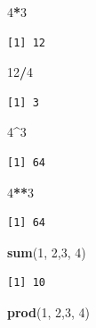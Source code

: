 \documentclass[]{book}
\newenvironment{Shaded}{\begin{snugshade}}{\end{snugshade}}
\newcommand{\KeywordTok}[1]{\textcolor[rgb]{0.13,0.29,0.53}{\textbf{#1}}}
\newcommand{\DecValTok}[1]{\textcolor[rgb]{0.00,0.00,0.81}{#1}}
\newcommand{\OperatorTok}[1]{\textcolor[rgb]{0.81,0.36,0.00}{\textbf{#1}}}
\newcommand{\NormalTok}[1]{#1}
\theoremstyle{definition}
\theoremstyle{definition}
\theoremstyle{definition}
\theoremstyle{remark}
\begin{document}
\begin{Shaded}
\begin{Highlighting}[]
\DecValTok{4}\OperatorTok{*}\DecValTok{3}
\end{Highlighting}
\end{Shaded}

\begin{verbatim}
[1] 12
\end{verbatim}

\begin{Shaded}
\begin{Highlighting}[]
\DecValTok{12}\OperatorTok{/}\DecValTok{4}
\end{Highlighting}
\end{Shaded}

\begin{verbatim}
[1] 3
\end{verbatim}

\begin{Shaded}
\begin{Highlighting}[]
\DecValTok{4}\OperatorTok{^}\DecValTok{3}
\end{Highlighting}
\end{Shaded}

\begin{verbatim}
[1] 64
\end{verbatim}

\begin{Shaded}
\begin{Highlighting}[]
\DecValTok{4}\OperatorTok{**}\DecValTok{3}
\end{Highlighting}
\end{Shaded}

\begin{verbatim}
[1] 64
\end{verbatim}

\begin{Shaded}
\begin{Highlighting}[]
\KeywordTok{sum}\NormalTok{(}\DecValTok{1}\NormalTok{, }\DecValTok{2}\NormalTok{,}\DecValTok{3}\NormalTok{, }\DecValTok{4}\NormalTok{)}
\end{Highlighting}
\end{Shaded}

\begin{verbatim}
[1] 10
\end{verbatim}

\begin{Shaded}
\begin{Highlighting}[]
\KeywordTok{prod}\NormalTok{(}\DecValTok{1}\NormalTok{, }\DecValTok{2}\NormalTok{,}\DecValTok{3}\NormalTok{, }\DecValTok{4}\NormalTok{)}
\end{Highlighting}
\end{Shaded}
\end{document}
